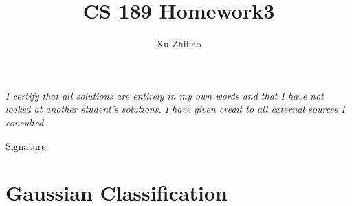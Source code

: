 \documentclass[a4paper,12pt]{article}
\title{CS 189 Homework3}
\author{Xu Zhihao}
\begin{document}
\pagestyle{fancy}{}
\fancyhf{} 
\rhead{\thepage \  / \pageref{LastPage}}

\maketitle

\emph{I certify that all solutions are entirely in my own words and that I have not looked at another student’s solutions. I have given credit to all external sources I consulted.} 
\begin{flushright}
Signature: \quad \quad \quad \quad \quad \quad \quad \quad \quad \quad \quad
\end{flushright}
\vspace{100pt}

\tableofcontents

\clearpage
\section{Gaussian Classification}
\end{document}
